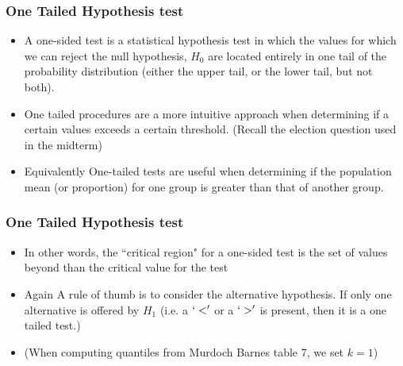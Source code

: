 \documentclass[a4]{beamer}
\begin{document}
\begin{frame}
\frametitle{One Tailed Hypothesis test}
\begin{itemize}

\item A one-sided test is a statistical hypothesis test in which the values for which we can reject the null hypothesis, $H_0$ are located entirely in one tail of the probability distribution (either the upper tail, or the lower tail, but not both).

\item One tailed procedures are a more intuitive approach when determining if a certain values exceeds a certain threshold. (Recall the election question used in the midterm)

\item Equivalently One-tailed tests are useful when determining if the population mean  (or proportion) for one group is greater than that of another group.
\end{itemize}
\end{frame}

\begin{frame}
\frametitle{One Tailed Hypothesis test}
\begin{itemize}

\item In other words, the ``critical region" for a one-sided test is the set of values beyond than the critical value for the test


\item Again A rule of thumb is to consider the alternative hypothesis.  If only one alternative is offered by $H_1$ (i.e. a $`<'$ or a $`>'$ is present, then it is a one tailed test.)
\item (When computing quantiles from Murdoch Barnes table 7, we set $k=1$)
\end{itemize}
\end{frame}
\end{document}
